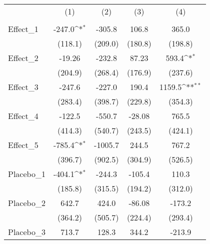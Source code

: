 {
\def\sym#1{\ifmmode^{#1}\else\(^{#1}\)\fi}
\begin{tabular}{l*{4}{c}}
\toprule
            &\multicolumn{1}{c}{(1)}&\multicolumn{1}{c}{(2)}&\multicolumn{1}{c}{(3)}&\multicolumn{1}{c}{(4)}\\
            &\multicolumn{1}{c}{} &\multicolumn{1}{c}{} &\multicolumn{1}{c}{} &\multicolumn{1}{c}{} \\
\midrule
Effect\_1    &      -247.0\sym{*}  &      -305.8         &       106.8         &       365.0         \\
            &     (118.1)         &     (209.0)         &     (180.8)         &     (198.8)         \\
\addlinespace
Effect\_2    &      -19.26         &      -232.8         &       87.23         &       593.4\sym{*}  \\
            &     (204.9)         &     (268.4)         &     (176.9)         &     (237.6)         \\
\addlinespace
Effect\_3    &      -247.6         &      -227.0         &       190.4         &      1159.5\sym{**} \\
            &     (283.4)         &     (398.7)         &     (229.8)         &     (354.3)         \\
\addlinespace
Effect\_4    &      -122.5         &      -550.7         &      -28.08         &       765.5         \\
            &     (414.3)         &     (540.7)         &     (243.5)         &     (424.1)         \\
\addlinespace
Effect\_5    &      -785.4\sym{*}  &     -1005.7         &       244.5         &       767.2         \\
            &     (396.7)         &     (902.5)         &     (304.9)         &     (526.5)         \\
\addlinespace
Placebo\_1   &      -404.1\sym{*}  &      -244.3         &      -105.4         &       110.3         \\
            &     (185.8)         &     (315.5)         &     (194.2)         &     (312.0)         \\
\addlinespace
Placebo\_2   &       642.7         &       424.0         &      -86.08         &      -173.2         \\
            &     (364.2)         &     (505.7)         &     (224.4)         &     (293.4)         \\
\addlinespace
Placebo\_3   &       713.7         &       128.3         &       344.2         &      -213.9         \\

\end{tabular}}

